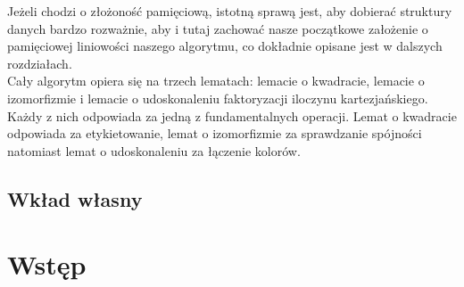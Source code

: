 \documentclass[12pt,a4paper,titlepage]{article}
\begin{document}
Jeżeli chodzi o złożoność pamięciową, istotną sprawą jest, aby dobierać struktury danych bardzo rozważnie, aby i tutaj zachować nasze początkowe założenie o pamięciowej liniowości naszego algorytmu, co dokładnie opisane jest w dalszych rozdziałach. \\
Cały algorytm opiera się na trzech lematach: lemacie o kwadracie, lemacie o izomorfizmie i lemacie o udoskonaleniu faktoryzacji iloczynu kartezjańskiego. Każdy z nich odpowiada za jedną z fundamentalnych operacji. Lemat o kwadracie odpowiada za etykietowanie, lemat o izomorfizmie za sprawdzanie spójności natomiast lemat o udoskonaleniu za łączenie kolorów.
\subsection{Wkład własny}
\newpage

\section{Wstęp}
\end{document}
